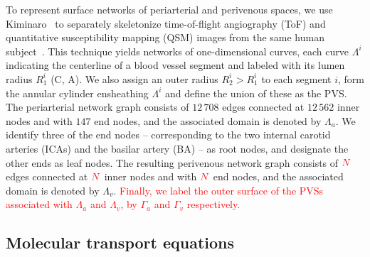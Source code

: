 \documentclass[fleqn,10pt]{wlscirep}
\newcommand{\discuss}[1]{\textcolor{red}{#1}}
\newcommand{\fixme}[1]{\textcolor{red}{#1}}
\begin{document}
To represent surface networks of periarterial and perivenous spaces,
we use Kiminaro~\cite{william_silversmith_2021_5539913} to separately
skeletonize time-of-flight angiography (ToF) and quantitative
susceptibility mapping (QSM) images from the same human
subject~\cite{hodneland2019new}. This technique yields networks of
one-dimensional curves, each curve $\Lambda^i$ indicating the
centerline of a blood vessel segment and labeled with its lumen radius
$R_1^i$ (C, A). We also assign an
outer radius $R_2^i > R_1^i$ to each segment $i$, form the annular
cylinder ensheathing $\Lambda^i$ and define the union of these as the
PVS. The periarterial network graph consists of $12\,708$ edges
connected at $12\,562$ inner nodes and with $147$ end nodes, and the
associated domain is denoted by $\Lambda_a$. We identify three of the
end nodes -- corresponding to the two internal carotid arteries (ICAs)
and the basilar artery (BA) -- as root nodes, and designate the other
ends as leaf nodes. The resulting perivenous network graph consists of
$\fixme{N}$ edges connected at $\fixme{N}$ inner nodes and with
$\fixme{N}$ end nodes, and the associated domain is denoted by
$\Lambda_v$. \discuss{Finally, we label the outer surface of the PVSs
  associated with $\Lambda_a$ and $\Lambda_v$, by $\Gamma_a$ and
  $\Gamma_v$ respectively.}

\subsection*{Molecular transport equations}
\end{document}
